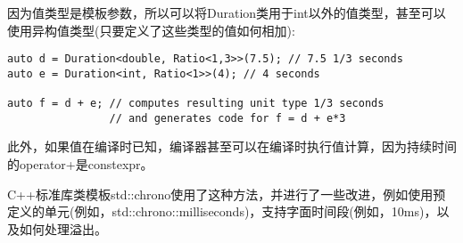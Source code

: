 因为值类型是模板参数，所以可以将Duration类用于int以外的值类型，甚至可以使用异构值类型(只要定义了这些类型的值如何相加):

\begin{lstlisting}[style=styleCXX]
auto d = Duration<double, Ratio<1,3>>(7.5); // 7.5 1/3 seconds
auto e = Duration<int, Ratio<1>>(4); // 4 seconds

auto f = d + e; // computes resulting unit type 1/3 seconds
				// and generates code for f = d + e*3
\end{lstlisting}

此外，如果值在编译时已知，编译器甚至可以在编译时执行值计算，因为持续时间的operator+是constexpr。

C++标准库类模板std::chrono使用了这种方法，并进行了一些改进，例如使用预定义的单元(例如，std::chrono::milliseconds)，支持字面时间段(例如，10ms)，以及如何处理溢出。































